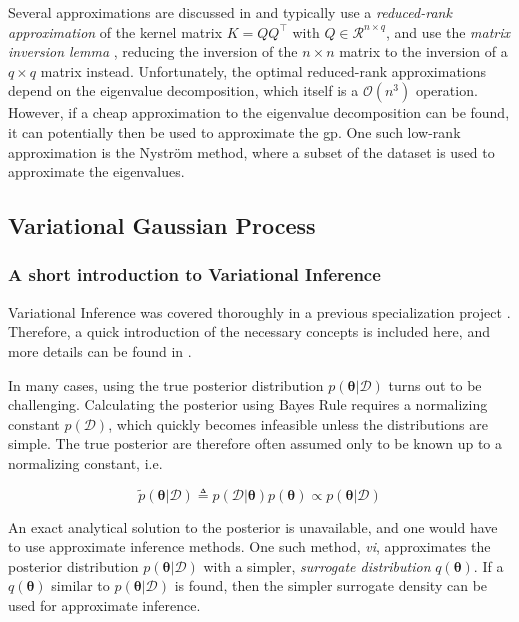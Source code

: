 Several approximations are discussed in \cite{rasmussen} and typically use a \textit{reduced-rank approximation} of the kernel matrix $K=Q Q^\intercal$ with $Q \in \mathcal{R}^{n \times q}$, and use the \textit{matrix inversion lemma} \cite[p .~201]{rasmussen} , reducing the inversion of the $n \times n$ matrix to the inversion of a $q \times q$ matrix instead. Unfortunately, the optimal reduced-rank approximations depend on the eigenvalue decomposition, which itself is a $\mathcal{O}(n^3)$ operation. However, if a cheap approximation to the eigenvalue decomposition can be found, it can potentially then be used to approximate the \acrshort{gp}. One such low-rank approximation is the Nyström method, where a subset of the dataset is used to approximate the eigenvalues.    

\subsection{Variational Gaussian Process}

\subsubsection{A short introduction to Variational Inference}
Variational Inference was covered thoroughly in a previous specialization project \cite{mellbye}. Therefore, a quick introduction of the necessary concepts is included here, and more details can be found in \cite{mellbye, murphy}.

In many cases, using the true posterior distribution $p(\boldsymbol{\theta} | \mathcal{D})$ turns out to be challenging. Calculating the posterior using Bayes Rule requires a normalizing constant $p(\mathcal{D})$, which quickly becomes infeasible unless the distributions are simple. The true posterior are therefore often assumed only to be known up to a normalizing constant, i.e.

\begin{equation}
    \tilde{p}(\boldsymbol{\theta} | \mathcal{D}) \triangleq p(\mathcal{D} | \boldsymbol{\theta})p(\boldsymbol{\theta}) \propto p(\boldsymbol{\theta} | \mathcal{D})
\end{equation}

An exact analytical solution to the posterior is unavailable, and one would have to use approximate inference methods. 
One such method, \textit{\acrfull{vi}}, approximates the posterior distribution $p(\boldsymbol{\theta} | \mathcal{D})$ with a simpler, \textit{surrogate distribution} $q(\boldsymbol{\theta})$. If a $q(\boldsymbol{\theta})$ similar to $p(\boldsymbol{\theta} | \mathcal{D})$ is found, then the simpler surrogate density can be used for approximate inference.

